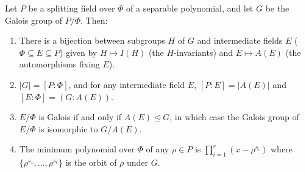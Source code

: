 Let $P$ be a splitting field over $\Phi$ of a separable polynomial, and let $G$ be the Galois group of $P/\Phi$. Then:
\begin{enumerate}
\item[(i)] There is a bijection between subgroups $H$ of $G$ and intermediate fields $E$ ($\Phi \subseteq E \subseteq P$) given by $H \mapsto I(H)$ (the $H$-invariants) and $E \mapsto A(E)$ (the automorphisms fixing $E$).
\item[(ii)] $|G| = [P:\Phi]$, and for any intermediate field $E$, $[P:E] = |A(E)|$ and $[E:\Phi] = (G : A(E))$.
\item[(iii)] $E/\Phi$ is Galois if and only if $A(E) \trianglelefteq G$, in which case the Galois group of $E/\Phi$ is isomorphic to $G/A(E)$.
\item[(iv)] The minimum polynomial over $\Phi$ of any $\rho \in P$ is $\prod_{i=1}^{r} (x - \rho^{s_i})$ where $\{\rho^{s_1}, \ldots, \rho^{s_r}\}$ is the orbit of $\rho$ under $G$.
\end{enumerate}

